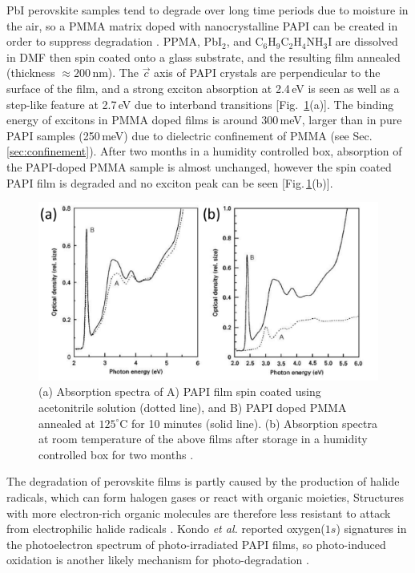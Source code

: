 PbI perovskite samples tend to degrade over long time periods due to moisture in the air, so a PMMA matrix doped with nanocrystalline PAPI can be created in order to suppress degradation \cite{Kitazawa1998}. PPMA, Pb$\textrm{I}_2$, and $\textrm{C}_6\textrm{H}_9\textrm{C}_2\textrm{H}_4\textrm{NH}_3\textrm{I}$ are dissolved in DMF then spin coated onto a glass substrate, and the resulting film annealed (thickness $\approx200$\,nm). The $\vec{c}$ axis of PAPI crystals are perpendicular to the surface of the film, and a strong exciton absorption at 2.4\,eV is seen as well as a step-like feature at 2.7\,eV due to interband transitions [Fig.\ \ref{2Fig10}(a)]. The binding energy of excitons in PMMA doped films is around 300\,meV, larger than in pure PAPI samples (250\,meV) due to dielectric confinement of PMMA (see Sec.\,\ref{sec:confinement}). After two months in a humidity controlled box, absorption of the PAPI-doped PMMA sample is almost unchanged, however the spin coated PAPI film is degraded and no exciton peak can be seen [Fig.\,\ref{2Fig10}(b)].
\begin{figure}
\centering
\includegraphics[width=\textwidth]{Fig10}
\caption{ (a) Absorption spectra of A) PAPI film spin coated using acetonitrile solution (dotted line), and B) PAPI doped PMMA annealed at $125^{\circ}$C for 10 minutes (solid line). (b) Absorption spectra at room temperature of the above films after storage in a humidity controlled box for two months \cite{Kitazawa1998}.}
\label{2Fig10}
\end{figure}

The degradation of perovskite films is partly caused by the production of halide radicals, which can form halogen gases or react with organic moieties, Structures with more electron-rich organic molecules are therefore less resistant to attack from electrophilic halide radicals \cite{Wei2014}. Kondo \textit{et al.} reported oxygen($1s$) signatures in the photoelectron spectrum of photo-irradiated PAPI films, so photo-induced oxidation is another likely mechanism for photo-degradation \cite{Kitazawa2002}.

